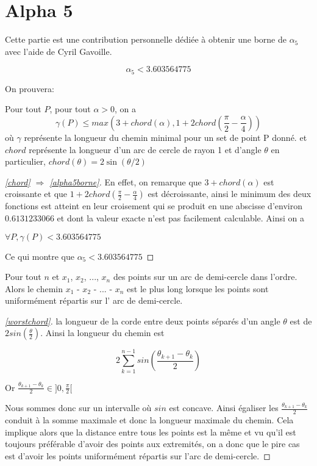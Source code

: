 \section{Alpha 5}

Cette partie est une contribution personnelle dédiée à obtenir une borne de $\alpha_5$ avec l'aide de Cyril Gavoille.

\begin{theorem}\label{alpha5borne}

$$\alpha_5 < 3.603564775$$

\end{theorem}

On prouvera:

\begin{lemma}\label{chord}
Pour tout $P$, pour tout $\alpha >0$, on a
$$\gamma(P) \leq max\left(3 + chord\left(\alpha\right), 1 + 2chord\left(\frac{\pi}{2} - \frac{\alpha}{4}\right)\right)$$
où $\gamma$ représente la longueur du chemin minimal pour un set de point P donné. et $chord$ représente la longueur d'un arc de cercle de rayon 1 et d'angle $\theta$ en particulier, $chord(\theta) = 2\sin(\theta/2)$
\end{lemma}

\begin{proof}[\ref{chord} $\Rightarrow$ \ref{alpha5borne}]

En effet, on remarque que $3+chord(\alpha)$ est croissante et que $1 + 2chord(\frac{\pi}{2} - \frac{\alpha}{4})$ est décroissante, ainsi le minimum des deux fonctions est atteint en leur croisement qui se produit en une abscisse d'environ $0.6131233066$ et dont la valeur exacte n'est pas facilement calculable. Ainsi on a

\(\forall P, \gamma(P) < 3.603564775\)

Ce qui montre que $\alpha_5 < 3.603564775$

\end{proof}

\begin{lemma}\label{worstchord}
Pour tout $n$ et $x_1$, $x_2$, ..., $x_n$ des points sur un arc de demi-cercle dans l'ordre. Alors le chemin $x_1$ - $x_2$ - ... - $x_n$ est le plus long lorsque les points sont uniformément répartis sur l' arc de demi-cercle.
\end{lemma}
\begin{proof}[\ref{worstchord}]
la longueur de la corde entre deux points séparés d'un angle $\theta$ est de $2sin\left(\frac{\theta}{2}\right)$. Ainsi la longueur du chemin est 

$$2\sum_{k=1}^{n-1} sin\left(\frac{\theta_{k+1} - \theta_k}{2}\right)$$

Or $\frac{\theta_{k+1} - \theta_k}{2} \in ]0, \frac{\pi}{2}[$

Nous sommes donc sur un intervalle où $sin$ est concave. Ainsi égaliser les $\frac{\theta_{k+1} - \theta_k}{2}$ conduit à la somme maximale et donc la longueur maximale du chemin. 
Cela implique alors que la distance entre tous les points est la même et vu qu'il est toujours préférable d'avoir des points aux extremités, on a donc que le pire cas est d'avoir les points uniformément répartis sur l'arc de demi-cercle.

\end{proof}

